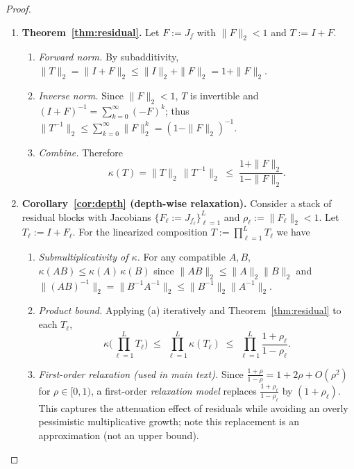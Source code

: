 \documentclass[twoside]{article}
\theoremstyle{definition}
\theoremstyle{remark}
\begin{document}
\begin{proof}
\leavevmode
\begin{enumerate}
  \item[(1)] \textbf{Theorem~\ref{thm:residual}.} Let $F:=J_f$ with $\|F\|_2<1$ and $T:=I+F$.
  \begin{enumerate}
    \item[(a)] \emph{Forward norm.} By subadditivity, $\|T\|_2=\|I+F\|_2\le \|I\|_2+\|F\|_2=1+\|F\|_2$.
    \item[(b)] \emph{Inverse norm.} Since $\|F\|_2<1$, $T$ is invertible and
    $(I+F)^{-1}=\sum_{k=0}^{\infty}(-F)^k$; thus $\|T^{-1}\|_2\le \sum_{k=0}^{\infty}\|F\|_2^k=(1-\|F\|_2)^{-1}$.
    \item[(c)] \emph{Combine.} Therefore
    \[
    \kappa(T)=\|T\|_2\,\|T^{-1}\|_2 \;\le\; \frac{1+\|F\|_2}{1-\|F\|_2}.
    \]
  \end{enumerate}

  \item[(2)] \textbf{Corollary~\ref{cor:depth} (depth-wise relaxation).}
  Consider a stack of residual blocks with Jacobians $\{F_\ell:=J_{f_\ell}\}_{\ell=1}^L$ and $\rho_\ell:=\|F_\ell\|_2<1$.
  Let $T_\ell:=I+F_\ell$. For the linearized composition $T:=\prod_{\ell=1}^L T_\ell$ we have
  \begin{enumerate}
    \item[(a)] \emph{Submultiplicativity of $\kappa$.}
    For any compatible $A,B$, $\kappa(AB)\le \kappa(A)\,\kappa(B)$ since
    $\|AB\|_2\le \|A\|_2\|B\|_2$ and $\|(AB)^{-1}\|_2=\|B^{-1}A^{-1}\|_2\le \|B^{-1}\|_2\|A^{-1}\|_2$.
    \item[(b)] \emph{Product bound.} Applying (a) iteratively and Theorem~\ref{thm:residual} to each $T_\ell$,
    \[
    \kappa\!\Big(\prod_{\ell=1}^L T_\ell\Big)
    \;\le\; \prod_{\ell=1}^L \kappa(T_\ell)
    \;\le\; \prod_{\ell=1}^L \frac{1+\rho_\ell}{1-\rho_\ell}.
    \]
    \item[(c)] \emph{First-order relaxation (used in main text).}
    Since $\frac{1+\rho}{1-\rho}=1+2\rho+O(\rho^2)$ for $\rho\in[0,1)$, a first-order \emph{relaxation model}
    replaces $\frac{1+\rho_\ell}{1-\rho_\ell}$ by $(1+\rho_\ell)$. This captures the attenuation effect of residuals
    while avoiding an overly pessimistic multiplicative growth; note this replacement is an approximation (not an upper bound).
  \end{enumerate}
\end{enumerate}
\end{proof}
\end{document}
